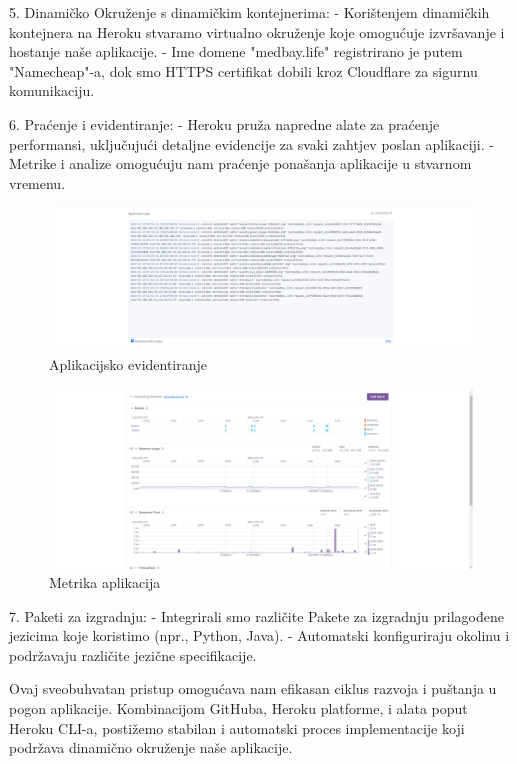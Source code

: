 5. Dinamičko Okruženje s  dinamičkim kontejnerima:
   - Korištenjem dinamičkih kontejnera na Heroku stvaramo virtualno okruženje koje omogućuje izvršavanje i hostanje naše aplikacije.
   - Ime domene "medbay.life" registrirano je putem "Namecheap"-a, dok smo HTTPS certifikat dobili kroz Cloudflare za sigurnu komunikaciju.

6. Praćenje i evidentiranje:
   - Heroku pruža napredne alate za praćenje performansi, uključujući detaljne evidencije za svaki zahtjev poslan aplikaciji.
   - Metrike i analize omogućuju nam praćenje ponašanja aplikacije u stvarnom vremenu.
   \begin{figure}[H]
       \centering
       \includegraphics[width=1\linewidth]{slike/appLogs.png}
       \caption{Aplikacijsko evidentiranje}
       \label{fig:enter-label}
   \end{figure}


\begin{figure}[H]
    \centering
    \includegraphics[width=1\linewidth]{slike/metrics.png}
    \caption{Metrika aplikacija}
    \label{fig:enter-label}
\end{figure}
7. Paketi za izgradnju:
   - Integrirali smo različite Pakete za izgradnju prilagođene jezicima koje koristimo (npr., Python, Java).
   - Automatski konfiguriraju okolinu i podržavaju različite jezične specifikacije.

Ovaj sveobuhvatan pristup omogućava nam efikasan ciklus razvoja i puštanja u pogon aplikacije. Kombinacijom GitHuba, Heroku platforme, i alata poput Heroku CLI-a, postižemo stabilan i automatski proces implementacije koji podržava dinamično okruženje naše aplikacije.


